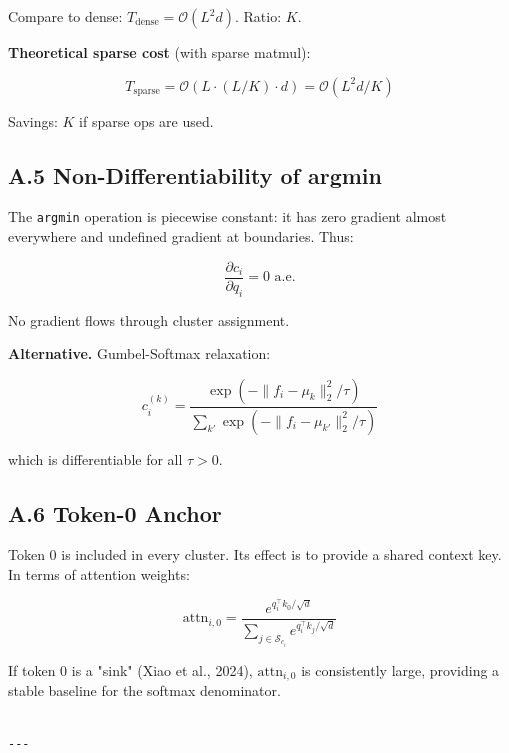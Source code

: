 Compare to dense: $T_\text{dense} = \mathcal{O}(L^2 d)$. Ratio: $K$.

\textbf{Theoretical sparse cost} (with sparse matmul):

\[
T_\text{sparse} = \mathcal{O}(L \cdot (L/K) \cdot d) = \mathcal{O}(L^2 d / K)
\tag{A.5}
\]

Savings: $K$ if sparse ops are used.

\subsection{A.5 Non-Differentiability of argmin}

The \texttt{argmin} operation is piecewise constant: it has zero gradient almost 
everywhere and undefined gradient at boundaries. Thus:

\[
\frac{\partial c_i}{\partial q_i} = 0 \text{ a.e.}
\tag{A.6}
\]

No gradient flows through cluster assignment.

\textbf{Alternative.} Gumbel-Softmax relaxation:

\[
c_i^{(k)} = \frac{\exp(-\|f_i - \mu_k\|_2^2 / \tau)}{\sum_{k'} \exp(-\|f_i - \mu_{k'}\|_2^2 / \tau)}
\tag{A.7}
\]

which is differentiable for all $\tau > 0$.

\subsection{A.6 Token-0 Anchor}

Token 0 is included in every cluster. Its effect is to provide a shared 
context key. In terms of attention weights:

\[
\text{attn}_{i,0} = \frac{e^{q_i^\top k_0 / \sqrt{d}}}{\sum_{j \in \mathcal{S}_{c_i}} e^{q_i^\top k_j / \sqrt{d}}}
\tag{A.8}
\]

If token 0 is a "sink" (Xiao et al., 2024), $\text{attn}_{i,0}$ is 
consistently large, providing a stable baseline for the softmax denominator.
\begin{lstlisting}

---
\end{lstlisting}